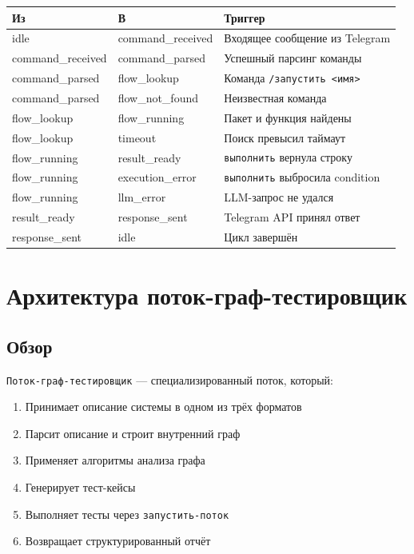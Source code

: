 \documentclass[10pt, oneside]{article}
\begin{document}
\begin{center}
\begin{tabularx}{\textwidth}{llL}
  \toprule
  \textbf{Из} & \textbf{В} & \textbf{Триггер} \\
  \midrule
  idle & command\_received & Входящее сообщение из Telegram \\
  command\_received & command\_parsed & Успешный парсинг команды \\
  command\_parsed & flow\_lookup & Команда \texttt{/запустить <имя>} \\
  command\_parsed & flow\_not\_found & Неизвестная команда \\
  flow\_lookup & flow\_running & Пакет и функция найдены \\
  flow\_lookup & timeout & Поиск превысил таймаут \\
  flow\_running & result\_ready & \texttt{выполнить} вернула строку \\
  flow\_running & execution\_error & \texttt{выполнить} выбросила condition \\
  flow\_running & llm\_error & LLM-запрос не удался \\
  result\_ready & response\_sent & Telegram API принял ответ \\
  response\_sent & idle & Цикл завершён \\
  \bottomrule
\end{tabularx}
\end{center}

\section{Архитектура поток-граф-тестировщик}

\subsection{Обзор}

\texttt{Поток-граф-тестировщик} --- специализированный поток, который:

\begin{enumerate}[leftmargin=1.5em]
  \item Принимает описание системы в одном из трёх форматов
  \item Парсит описание и строит внутренний граф
  \item Применяет алгоритмы анализа графа
  \item Генерирует тест-кейсы
  \item Выполняет тесты через \texttt{запустить-поток}
  \item Возвращает структурированный отчёт
\end{enumerate}
\end{document}
